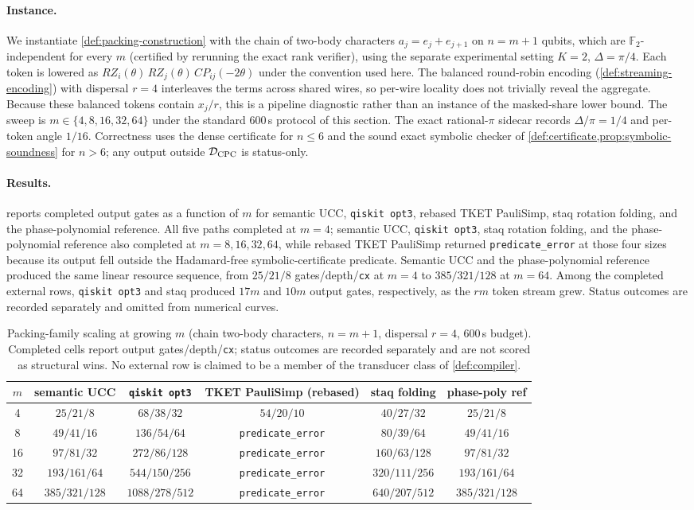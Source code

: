 \documentclass[a4paper,twocolumn,10pt,unpublished]{quantumarticle}
\newcommand{\Ftwo}{\mathbb{F}_2}
\newcommand{\pkResultsSummary}{All five paths completed at $m=4$; semantic
UCC, \texttt{qiskit opt3}, staq rotation folding, and the phase-polynomial
reference also completed at $m=8,16,32,64$, while rebased TKET PauliSimp
returned \texttt{predicate\_error} at those four sizes because its output
fell outside the Hadamard-free symbolic-certificate predicate. Semantic UCC
and the phase-polynomial reference produced the same linear resource sequence,
from $25/21/8$ gates/depth/\texttt{cx} at $m=4$ to $385/321/128$ at $m=64$.
Among the completed external rows, \texttt{qiskit opt3} and staq produced
$17m$ and $10m$ output gates, respectively, as the $r m$ token stream grew.
Status outcomes are recorded separately and omitted from numerical curves.}
\begin{document}
\paragraph{Instance.}
We instantiate \cref{def:packing-construction} with the chain of two-body
characters $a_j = e_j + e_{j+1}$ on $n = m+1$ qubits, which are
$\Ftwo$-independent for every $m$ (certified by rerunning the exact rank
verifier), using the separate experimental setting $K=2$, $\Delta=\pi/4$.
Each token is lowered as
$RZ_i(\theta)\,RZ_j(\theta)\,CP_{ij}(-2\theta)$ under the convention
used here. The balanced round-robin encoding
(\cref{def:streaming-encoding}) with dispersal $r = 4$ interleaves the
terms across shared wires, so per-wire locality does not trivially reveal
the aggregate.  Because these balanced tokens contain $x_j/r$, this is a
pipeline diagnostic rather than an instance of the masked-share lower
bound. The sweep is $m \in \{4, 8, 16, 32, 64\}$ under the
standard 600\,s protocol of this section.  The exact rational-$\pi$ sidecar
records $\Delta/\pi=1/4$ and per-token angle $1/16$.  Correctness uses the
dense certificate for $n\leq6$ and the sound exact symbolic checker of
\cref{def:certificate,prop:symbolic-soundness} for $n>6$; any output outside
$\mathcal D_{\rm CPC}$ is status-only.

\paragraph{Results.}
 reports completed output gates as a function of $m$
for semantic UCC, \texttt{qiskit opt3}, rebased TKET PauliSimp, staq
rotation folding, and the phase-polynomial reference.
\pkResultsSummary

\begin{table}[!t]
\centering
\small
\begin{tabular}{cccccc}
\toprule
$m$ & semantic UCC & \texttt{qiskit opt3} & TKET PauliSimp (rebased) & staq folding & phase-poly ref \\
\midrule
4  & $25/21/8$ & $68/38/32$ & $54/20/10$ & $40/27/32$ & $25/21/8$ \\
8  & $49/41/16$ & $136/54/64$ & \texttt{predicate\_error} & $80/39/64$ & $49/41/16$ \\
16 & $97/81/32$ & $272/86/128$ & \texttt{predicate\_error} & $160/63/128$ & $97/81/32$ \\
32 & $193/161/64$ & $544/150/256$ & \texttt{predicate\_error} & $320/111/256$ & $193/161/64$ \\
64 & $385/321/128$ & $1088/278/512$ & \texttt{predicate\_error} & $640/207/512$ & $385/321/128$ \\
\bottomrule
\end{tabular}
\caption{Packing-family scaling at growing $m$ (chain two-body
characters, $n = m+1$, dispersal $r = 4$, 600\,s budget). Completed cells
report output gates/depth/\texttt{cx}; status outcomes are recorded separately and are not
scored as structural wins. No external row is claimed to be a member of
the transducer class of \cref{def:compiler}.}
\label{tab:packing-scaling}
\end{table}
\end{document}
